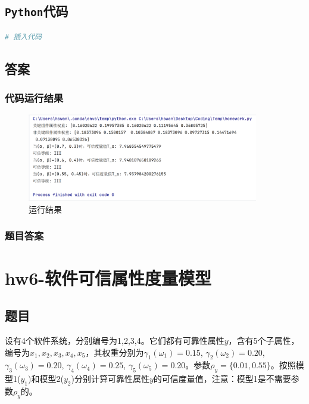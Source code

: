 \documentclass{article}
\begin{document}
\subsection{\texttt{Python}代码}

\begin{lstlisting}[language=Python]
	# 插入代码
\end{lstlisting}

\subsection{答案}

\subsubsection{代码运行结果}

\begin{figure}[H]
	\centering
	\includegraphics[width=0.9\textwidth]{img/1.png}
	\caption{运行结果}
\end{figure}

\subsubsection{题目答案}













\section{hw6-软件可信属性度量模型}

\subsection{题目}

设有4个软件系统，分别编号为1,2,3,4。它们都有可靠性属性$y$，含有5个子属性，编号为$x_1, x_2, x_3, x_4, x_5$，其权重分别为$\gamma_1(\omega_1) = 0.15$, $\gamma_2(\omega_2) = 0.20$, $\gamma_3(\omega_3) = 0.20$, $\gamma_4(\omega_4) = 0.25$, $\gamma_5(\omega_5) = 0.20$。参数$\rho_y = \{0.01, 0.55\}$。按照模型1($y_1$)和模型2($y_2$)分别计算可靠性属性$y$的可信度量值，注意：模型1是不需要参数$\rho_y$的。
\end{document}
